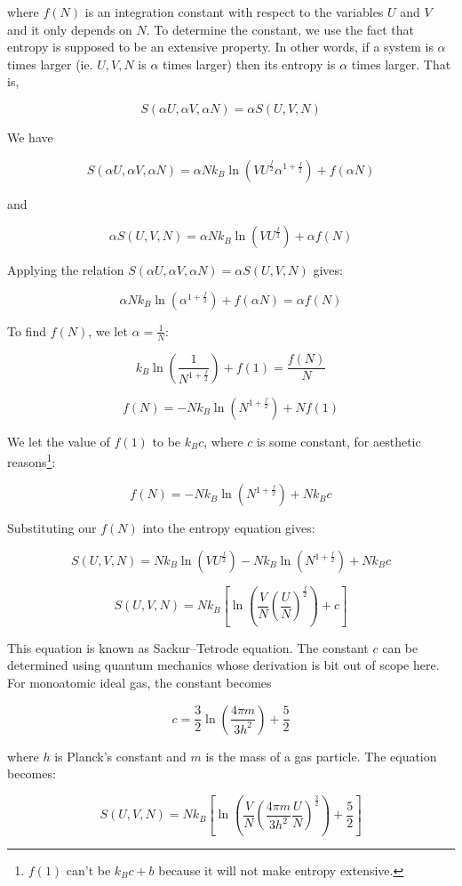 where $f(N)$ is an integration constant with respect to the variables $U$ and $V$ and it only depends on $N$. To determine the constant, we use the fact that entropy is supposed to be an extensive property. In other words, if a system is $\alpha$ times larger (ie. $U,V,N$ is $\alpha$ times larger) then its entropy is $\alpha$ times larger. That is,

\[S(\alpha U,\alpha V,\alpha N)=\alpha S(U,V,N)\]

We have

\[S(\alpha U,\alpha V,\alpha N)=\alpha Nk_B\ln\left(VU^\frac{f}{2} \alpha^{1+\frac{f}{2}}\right)+f(\alpha N)\]

and

\[\alpha S(U,V,N)=\alpha Nk_B\ln\left(VU^\frac{f}{2}\right)+\alpha f(N)\]

Applying the relation $S(\alpha U,\alpha V,\alpha N)=\alpha S(U,V,N)$ gives:

\[\alpha Nk_B\ln\left(\alpha^{1+\frac{f}{2}}\right)+f(\alpha N)=\alpha f(N)\]

To find $f(N)$, we let $\alpha=\frac1N$:

\[k_B\ln\left(\frac{1}{N^{1+\frac{f}{2}}}\right)+f(1)=\frac{f(N)}{N}\]

\[f(N)=-Nk_B\ln\left(N^{1+\frac{f}{2}}\right)+Nf(1)\]

We let the value of $f(1)$ to be $k_Bc$, where $c$ is some constant, for aesthetic reasons\footnote{$f(1)$ can't be $k_Bc+b$ because it will not make entropy extensive.}:

\[f(N)=-Nk_B\ln\left(N^{1+\frac{f}{2}}\right)+Nk_Bc\]

Substituting our $f(N)$ into the entropy equation gives:

\[S(U,V,N)=Nk_B\ln\left(VU^\frac{f}{2}\right)-Nk_B\ln\left(N^{1+\frac{f}{2}}\right)+Nk_Bc\]

\[\boxed{S(U,V,N)=Nk_B\left[\ln\left(\frac{V}{N} \left(\frac{U}{N}\right)^\frac{f}{2}\right)+c\right]}\]

This equation is known as Sackur–Tetrode equation. The constant $c$ can be determined using quantum mechanics whose derivation is bit out of scope here. For monoatomic ideal gas, the constant becomes

\[c=\frac32 \ln\left( \frac{4\pi m}{3h^2} \right) + \frac52\]

where $h$ is Planck's constant and $m$ is the mass of a gas particle. The equation becomes:

\[\boxed{S(U,V,N)=Nk_B\left[\ln\left( \frac VN \left(\frac{4\pi m}{3h^2}\frac UN\right)^{\frac32}\right)+\frac52\right]}\]

